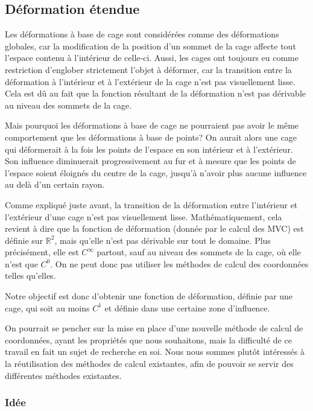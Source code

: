 \subsection{Déformation étendue}

Les déformations à base de cage sont considérées comme des déformations
globales, car la modification de la position d'un sommet de la cage affecte
tout l'espace contenu à l'intérieur de celle-ci. Aussi, les cages ont toujours
eu comme restriction d'englober strictement l'objet à déformer, car la
transition entre la déformation à l'intérieur et à l'extérieur de la cage
n'est pas visuellement lisse. Cela est dû au fait que la fonction résultant de
la déformation n'est pas dérivable au niveau des sommets de la cage.

Mais pourquoi les déformations à base de cage ne pourraient pas avoir le même
comportement que les déformations à base de points? On aurait alors une cage
qui déformerait à la fois les points de l'espace en son intérieur et à
l'extérieur. Son influence diminuerait progressivement au fur et à mesure que
les points de l'espace soient éloignés du centre de la cage, jusqu'à n'avoir
plus aucune influence au delà d'un certain rayon.

Comme expliqué juste avant, la transition de la déformation entre l'intérieur
et l'extérieur d'une cage n'est pas visuellement lisse. Mathématiquement, cela
revient à dire que la fonction de déformation (donnée par le calcul des MVC)
est définie sur $\mathbb{R}^2$, mais qu'elle n'est pas dérivable sur tout le
domaine. Plus précisément, elle est $C^{\infty}$ partout, sauf au niveau des
sommets de la cage, où elle n'est que $C^0$. On ne peut donc pas utiliser les
méthodes de calcul des coordonnées telles qu'elles.

Notre objectif est donc d'obtenir une fonction de déformation, définie par une
cage, qui soit au moins $C^1$ et définie dans une certaine zone d'influence.

On pourrait se pencher sur la mise en place d'une nouvelle méthode de calcul
de coordonnées, ayant les propriétés que nous souhaitons, mais la difficulté
de ce travail en fait un sujet de recherche en soi. Nous nous sommes plutôt
intéressés à la réutilisation des méthodes de calcul existantes, afin de
pouvoir se servir des différentes méthodes existantes.

\subsubsection{Idée}

